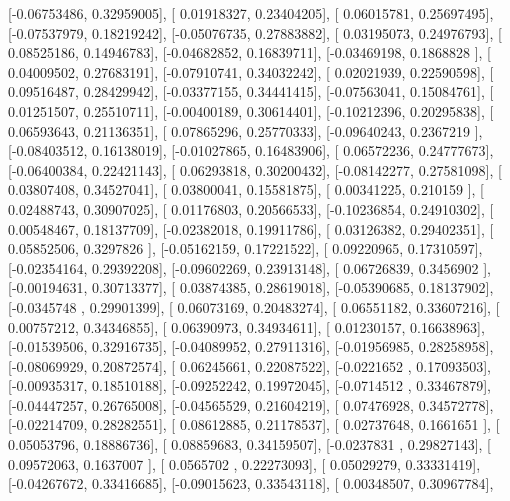 \documentclass{article}
\begin{document}
       [-0.06753486,  0.32959005],
       [ 0.01918327,  0.23404205],
       [ 0.06015781,  0.25697495],
       [-0.07537979,  0.18219242],
       [-0.05076735,  0.27883882],
       [ 0.03195073,  0.24976793],
       [ 0.08525186,  0.14946783],
       [-0.04682852,  0.16839711],
       [-0.03469198,  0.1868828 ],
       [ 0.04009502,  0.27683191],
       [-0.07910741,  0.34032242],
       [ 0.02021939,  0.22590598],
       [ 0.09516487,  0.28429942],
       [-0.03377155,  0.34441415],
       [-0.07563041,  0.15084761],
       [ 0.01251507,  0.25510711],
       [-0.00400189,  0.30614401],
       [-0.10212396,  0.20295838],
       [ 0.06593643,  0.21136351],
       [ 0.07865296,  0.25770333],
       [-0.09640243,  0.2367219 ],
       [-0.08403512,  0.16138019],
       [-0.01027865,  0.16483906],
       [ 0.06572236,  0.24777673],
       [-0.06400384,  0.22421143],
       [ 0.06293818,  0.30200432],
       [-0.08142277,  0.27581098],
       [ 0.03807408,  0.34527041],
       [ 0.03800041,  0.15581875],
       [ 0.00341225,  0.210159  ],
       [ 0.02488743,  0.30907025],
       [ 0.01176803,  0.20566533],
       [-0.10236854,  0.24910302],
       [ 0.00548467,  0.18137709],
       [-0.02382018,  0.19911786],
       [ 0.03126382,  0.29402351],
       [ 0.05852506,  0.3297826 ],
       [-0.05162159,  0.17221522],
       [ 0.09220965,  0.17310597],
       [-0.02354164,  0.29392208],
       [-0.09602269,  0.23913148],
       [ 0.06726839,  0.3456902 ],
       [-0.00194631,  0.30713377],
       [ 0.03874385,  0.28619018],
       [-0.05390685,  0.18137902],
       [-0.0345748 ,  0.29901399],
       [ 0.06073169,  0.20483274],
       [ 0.06551182,  0.33607216],
       [ 0.00757212,  0.34346855],
       [ 0.06390973,  0.34934611],
       [ 0.01230157,  0.16638963],
       [-0.01539506,  0.32916735],
       [-0.04089952,  0.27911316],
       [-0.01956985,  0.28258958],
       [-0.08069929,  0.20872574],
       [ 0.06245661,  0.22087522],
       [-0.0221652 ,  0.17093503],
       [-0.00935317,  0.18510188],
       [-0.09252242,  0.19972045],
       [-0.0714512 ,  0.33467879],
       [-0.04447257,  0.26765008],
       [-0.04565529,  0.21604219],
       [ 0.07476928,  0.34572778],
       [-0.02214709,  0.28282551],
       [ 0.08612885,  0.21178537],
       [ 0.02737648,  0.1661651 ],
       [ 0.05053796,  0.18886736],
       [ 0.08859683,  0.34159507],
       [-0.0237831 ,  0.29827143],
       [ 0.09572063,  0.1637007 ],
       [ 0.0565702 ,  0.22273093],
       [ 0.05029279,  0.33331419],
       [-0.04267672,  0.33416685],
       [-0.09015623,  0.33543118],
       [ 0.00348507,  0.30967784],
\end{document}
